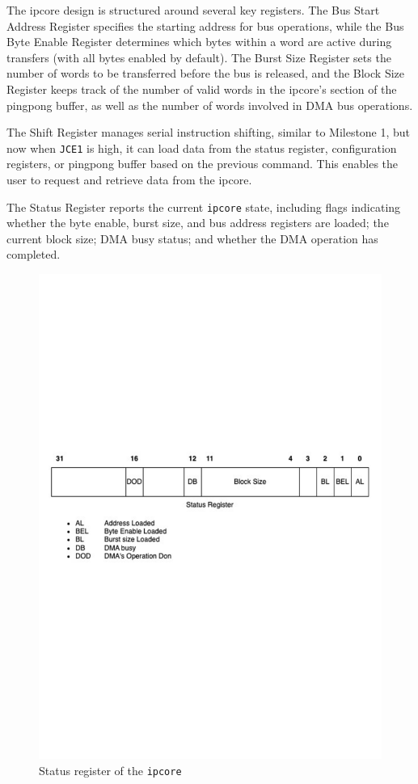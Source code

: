 \documentclass[a4paper,11pt,oneside]{report}
\begin{document}
The ipcore design is structured around several key registers. 
The Bus Start Address Register specifies the starting address for bus operations, 
while the Bus Byte Enable Register determines which bytes within a word are active during transfers 
(with all bytes enabled by default). 
The Burst Size Register sets the number of words to be transferred before the bus is released, 
and the Block Size Register keeps track of the number of valid words in the ipcore's section of the pingpong buffer, 
as well as the number of words involved in DMA bus operations.

The Shift Register manages serial instruction shifting, similar to Milestone 1, but now when \texttt{JCE1} is high, it can load data from the status register, configuration registers, or pingpong buffer based on the previous command.
This enables the user to request and retrieve data from the ipcore.

The Status Register reports the current \texttt{ipcore} state, including flags indicating whether the byte enable, burst size, and bus address registers are loaded; the current block size; DMA busy status; and whether the DMA operation has completed.

\begin{figure}
    \centering
    \includegraphics[width=0.9\linewidth]{figures/status_reg.pdf}
    \caption{Status register of the \texttt{ipcore}}
    \label{fig:status_register}
\end{figure}
\end{document}
